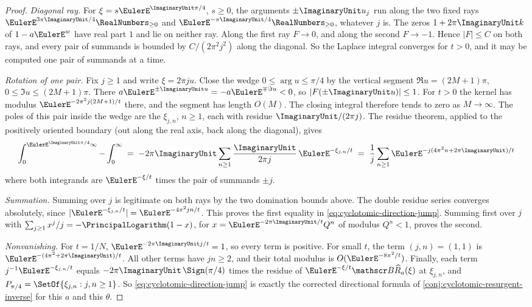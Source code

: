 \begin{proof}
\emph{Diagonal ray.}  For \(\xi=s\EulerE^{\ImaginaryUnit\pi/4}\), \(s\ge0\), the
arguments \(\pm\ImaginaryUnit u_j\) run along the two fixed rays
\(\EulerE^{3\pi\ImaginaryUnit/4}\RealNumbers_{\ge0}\) and
\(\EulerE^{-\pi\ImaginaryUnit/4}\RealNumbers_{\ge0}\), whatever \(j\) is.
The zeros \(1+2\pi\ImaginaryUnit k\) of \(1-a\EulerE^{w}\) have real part \(1\)
and lie on neither ray.  Along the first ray \(F\to0\), and along the second
\(F\to-1\).  Hence \(\lvert F\rvert\le C\) on both rays, and every pair of
summands is bounded by \(C/(2\pi^2j^2)\) along the diagonal.  So the Laplace
integral converges for \(t>0\), and it may be computed one pair of summands at
a time.

\emph{Rotation of one pair.}  Fix \(j\ge1\) and write \(\xi=2\pi ju\).  Close the
wedge \(0\le\arg u\le\pi/4\) by the vertical segment
\(\Re u=(2M+1)\pi\), \(0\le\Im u\le(2M+1)\pi\).  There
\(a\EulerE^{\pm\ImaginaryUnit u}=-a\EulerE^{\mp\Im u}<0\), so
\(\lvert F(\pm\ImaginaryUnit u)\rvert\le1\).  For \(t>0\) the kernel has modulus
\(\EulerE^{-2\pi^2j(2M+1)/t}\) there, and the segment has length
\(O(M)\).  The closing integral therefore tends to zero as \(M\to\infty\).
The poles of this pair inside the wedge are the \(\xi_{j,n}\), \(n\ge1\), each
with residue \(\ImaginaryUnit/(2\pi j)\).  The residue theorem, applied to the
positively oriented boundary (out along the real axis, back along the
diagonal), gives
\[
 \int_0^{\EulerE^{\ImaginaryUnit\pi/4}\infty}
  -\int_0^{\infty}
  \;=\;-2\pi\ImaginaryUnit\sum_{n\ge1}\frac{\ImaginaryUnit}{2\pi j}\,
        \EulerE^{-\xi_{j,n}/t}
  \;=\;\frac1j\sum_{n\ge1}\EulerE^{-j(4\pi^2n+2\pi\ImaginaryUnit)/t}
\]
where both integrands are \(\EulerE^{-\xi/t}\) times the pair of summands
\(\pm j\).

\emph{Summation.}  Summing over \(j\) is legitimate on both rays by the two
domination bounds above.  The double residue series converges absolutely,
since \(\lvert\EulerE^{-\xi_{j,n}/t}\rvert=\EulerE^{-4\pi^2jn/t}\).  This proves
the first equality in \eqref{eq:cyclotomic-direction-jump}.  Summing first over
\(j\) with \(\sum_{j\ge1}x^j/j=-\PrincipalLogarithm(1-x)\), for
\(x=\EulerE^{-2\pi\ImaginaryUnit/t}Q^n\) of modulus \(Q^n<1\), proves the second.

\emph{Nonvanishing.}  For \(t=1/N\), \(\EulerE^{-2\pi\ImaginaryUnit j/t}=1\), so
every term is positive.  For small \(t\), the term \((j,n)=(1,1)\) is
\(\EulerE^{-(4\pi^2+2\pi\ImaginaryUnit)/t}\).  All other terms have \(jn\ge2\),
and their total modulus is \(O(\EulerE^{-8\pi^2/t})\).  Finally, each term
\(j^{-1}\EulerE^{-\xi_{j,n}/t}\) equals \(-2\pi\ImaginaryUnit\,\Sign(\pi/4)\) times
the residue of \(\EulerE^{-\xi/t}\mathscr B\FormalGevreySeriesSymbol{R}_a(\xi)\)
at \(\xi_{j,n}\), and \(P_{\pi/4}=\SetOf{\xi_{j,n}:j,n\ge1}\).  So \eqref{eq:cyclotomic-direction-jump} is exactly the corrected
directional formula of \cref{conj:cyclotomic-resurgent-inverse} for this \(a\)
and this \(\theta\).
\end{proof}

